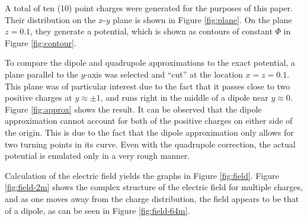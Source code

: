 \documentclass[10pt,a4paper,twoside]{article}
\begin{document}
A total of ten (10) point charges were generated for the purposes of this paper. Their distribution on the $x$-$y$ plane is shown in Figure \ref{fig:plane}. On the plane $z = 0.1$, they generate a potential, which is shown as contours of constant $\Phi$ in Figure \ref{fig:contour}.

To compare the dipole and quadrupole approximations to the exact potential, a plane parallel to the $y$-axis was selected and ``cut'' at the location $x = z = 0.1$. This plane was of particular interest due to the fact that it passes close to two positive charges at $y \approx \pm 1$, and runs right in the middle of a dipole near $y \approx 0$. Figure \ref{fig:approx} shows the result. It can be observed that the dipole approximation cannot account for both of the positive charges on either side of the origin. This is due to the fact that the dipole approximation only allows for two turning points in its curve. Even with the quadrupole correction, the actual potential is emulated only in a very rough manner.

Calculation of the electric field yields the graphs in Figure \ref{fig:field}. Figure \ref{fig:field-2m} shows the complex structure of the electric field for multiple charges, and as one moves away from the charge distribution, the field appears to be that of a dipole, as can be seen in Figure \ref{fig:field-64m}.
\end{document}
